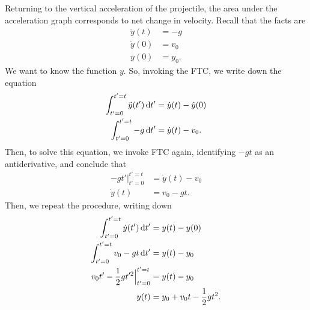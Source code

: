 Returning to the vertical acceleration of the projectile, the area under the acceleration graph
corresponds to net change in velocity. Recall that the facts are
\begin{align*}
    \ddot{y}(t) &= -g \\
    \dot{y}(0)  &= v_0 \\
    y(0)        &= y_0.
  \end{align*}
  We want to know the function $y$. So, invoking the FTC, we write down the equation
  \begin{align*}
    \int_{t'=0}^{t'=t}\ddot{y}(t') \dt' &= \dot{y}(t) - \dot{y}(0) \\
    \int_{t'=0}^{t'=t}-g \dt' &= \dot{y}(t) - v_0.
\end{align*}
Then, to solve this equation, we invoke FTC again, identifying $-gt$ as an antiderivative, and
conclude that
\begin{align*}
    -gt'\Big|_{t'=0}^{t'=t} &= \dot{y}(t) - v_0 \\
    \dot{y}(t)                   &= v_0 - gt.
\end{align*}
Then, we repeat the procedure, writing down
\begin{align*}
    \int_{t'=0}^{t'=t}\dot{y}(t') \dt' &= y(t) - y(0) \\
    \int_{t'=0}^{t'=t}v_0 - gt \dt'    &= y(t) - y_0 \\
    v_0t' - \frac{1}{2}gt'^2\Big|_{t'=0}^{t'=t} &= y(t) - y_0 \\
    y(t) &= y_0 + v_0t - \frac{1}{2}gt^2.
\end{align*}

